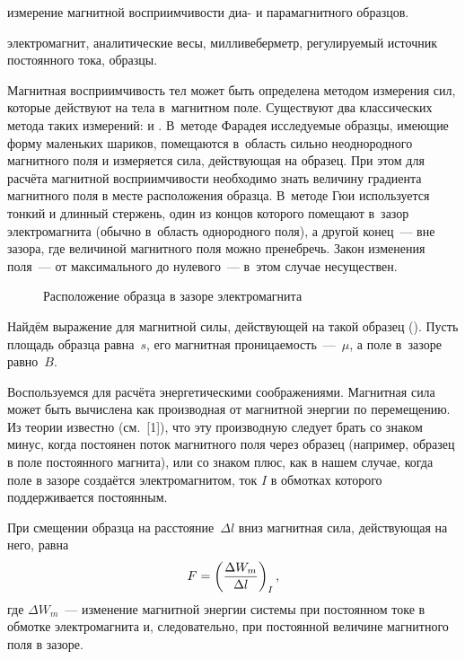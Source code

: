 
\begin{lab:aim}
	измерение магнитной восприимчивости диа- и парамагнитного образцов.
\end{lab:aim}

\begin{lab:equipment}
	электромагнит, аналитические весы, милливеберметр,  регулируемый источник постоянного тока, образцы.
\end{lab:equipment}

Магнитная восприимчивость тел может быть определена методом измерения сил, которые действуют на тела в~магнитном поле.
Существуют два классических метода таких измерений:  и . В~методе Фарадея
исследуемые образцы, имеющие форму маленьких шариков, помещаются в~область сильно неоднородного магнитного поля и
измеряется сила, действующая на образец. При этом для расчёта магнитной восприимчивости необходимо знать величину
градиента магнитного поля в месте расположения образца. В~методе Гюи используется тонкий и длинный стержень, один из
концов которого помещают в~зазор электромагнита (обычно в~область однородного поля), а другой конец~--- вне зазора, где
величиной магнитного поля можно пренебречь. Закон изменения поля~--- от максимального до нулевого~--- в~этом случае
несуществен.

\begin{wrapfigure}{r}{0.4\textwidth}
	\caption{Расположение образца в зазоре электромагнита}
\end{wrapfigure}

Найдём выражение для магнитной силы, действующей на такой образец (). Пусть площадь образца равна~$s$, его магнитная
проницаемость~---~$\mu$, а поле в~зазоре равно~$B$.

Воспользуемся для расчёта энергетическими соображениями. Магнитная сила может быть вычислена как производная от
магнитной энергии по перемещению. Из теории известно (см.~[1]), что эту производную следует брать со знаком минус, когда
постоянен поток магнитного поля через образец (например, образец в поле постоянного магнита), или со знаком плюс, как в нашем случае, когда поле в зазоре создаётся
электромагнитом, ток $I$ в обмотках которого поддерживается постоянным.

При смещении образца на расстояние~$\Delta l$ вниз магнитная сила, действующая на него, равна
\begin{equation}%
	\eqmark{force}
	F=\left(\frac{\Delta W_m}{\Delta l}\right)_I,
\end{equation}
где $\Delta W_m$~--- изменение магнитной энергии системы при постоянном токе в обмотке электромагнита и, следовательно, при
постоянной величине магнитного поля в зазоре.

